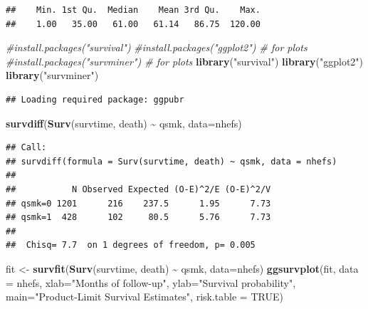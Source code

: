 \documentclass[
  10pt,
]{book}
\newenvironment{Shaded}{\begin{snugshade}}{\end{snugshade}}
\newcommand{\CommentTok}[1]{\textcolor[rgb]{0.56,0.35,0.01}{\textit{#1}}}
\newcommand{\DataTypeTok}[1]{\textcolor[rgb]{0.13,0.29,0.53}{#1}}
\newcommand{\DecValTok}[1]{\textcolor[rgb]{0.00,0.00,0.81}{#1}}
\newcommand{\KeywordTok}[1]{\textcolor[rgb]{0.13,0.29,0.53}{\textbf{#1}}}
\newcommand{\NormalTok}[1]{#1}
\newcommand{\OperatorTok}[1]{\textcolor[rgb]{0.81,0.36,0.00}{\textbf{#1}}}
\newcommand{\OtherTok}[1]{\textcolor[rgb]{0.56,0.35,0.01}{#1}}
\newcommand{\StringTok}[1]{\textcolor[rgb]{0.31,0.60,0.02}{#1}}
\begin{document}
\begin{Shaded}
\end{Shaded}

\begin{verbatim}
##    Min. 1st Qu.  Median    Mean 3rd Qu.    Max. 
##    1.00   35.00   61.00   61.14   86.75  120.00
\end{verbatim}

\begin{Shaded}
\begin{Highlighting}[]
\CommentTok{\#install.packages("survival")}
\CommentTok{\#install.packages("ggplot2") \# for plots}
\CommentTok{\#install.packages("survminer") \# for plots}
\KeywordTok{library}\NormalTok{(}\StringTok{"survival"}\NormalTok{)}
\KeywordTok{library}\NormalTok{(}\StringTok{"ggplot2"}\NormalTok{)}
\KeywordTok{library}\NormalTok{(}\StringTok{"survminer"}\NormalTok{)}
\end{Highlighting}
\end{Shaded}

\begin{verbatim}
## Loading required package: ggpubr
\end{verbatim}

\begin{Shaded}
\begin{Highlighting}[]
\KeywordTok{survdiff}\NormalTok{(}\KeywordTok{Surv}\NormalTok{(survtime, death) }\OperatorTok{\textasciitilde{}}\StringTok{ }\NormalTok{qsmk, }\DataTypeTok{data=}\NormalTok{nhefs)}
\end{Highlighting}
\end{Shaded}

\begin{verbatim}
## Call:
## survdiff(formula = Surv(survtime, death) ~ qsmk, data = nhefs)
## 
##           N Observed Expected (O-E)^2/E (O-E)^2/V
## qsmk=0 1201      216    237.5      1.95      7.73
## qsmk=1  428      102     80.5      5.76      7.73
## 
##  Chisq= 7.7  on 1 degrees of freedom, p= 0.005
\end{verbatim}

\begin{Shaded}
\begin{Highlighting}[]
\NormalTok{fit \textless{}{-}}\StringTok{ }\KeywordTok{survfit}\NormalTok{(}\KeywordTok{Surv}\NormalTok{(survtime, death) }\OperatorTok{\textasciitilde{}}\StringTok{ }\NormalTok{qsmk, }\DataTypeTok{data=}\NormalTok{nhefs)}
\KeywordTok{ggsurvplot}\NormalTok{(fit, }\DataTypeTok{data =}\NormalTok{ nhefs, }\DataTypeTok{xlab=}\StringTok{"Months of follow{-}up"}\NormalTok{,}
           \DataTypeTok{ylab=}\StringTok{"Survival probability"}\NormalTok{,}
           \DataTypeTok{main=}\StringTok{"Product{-}Limit Survival Estimates"}\NormalTok{, }\DataTypeTok{risk.table =} \OtherTok{TRUE}\NormalTok{)}
\end{Highlighting}
\end{Shaded}
\end{document}
